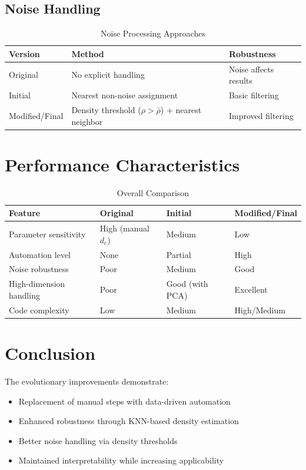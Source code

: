 \documentclass{article}
\begin{document}
\subsection{Noise Handling}
\begin{table}[H]
\centering
\caption{Noise Processing Approaches}
\begin{tabular}{lll}
\toprule
\textbf{Version} & \textbf{Method} & \textbf{Robustness} \\
\midrule
Original & No explicit handling & Noise affects results \\
Initial & Nearest non-noise assignment & Basic filtering \\
Modified/Final & Density threshold ($\rho > \bar{\rho}$) + nearest neighbor & Improved filtering \\
\bottomrule
\end{tabular}
\end{table}

\section{Performance Characteristics}

\begin{table}[H]
\centering
\caption{Overall Comparison}
\begin{tabular}{llll}
\toprule
\textbf{Feature} & \textbf{Original} & \textbf{Initial} & \textbf{Modified/Final} \\
\midrule
Parameter sensitivity & High (manual $d_c$) & Medium & Low \\
Automation level & None & Partial & High \\
Noise robustness & Poor & Medium & Good \\
High-dimension handling & Poor & Good (with PCA) & Excellent \\
Code complexity & Low & Medium & High/Medium \\
\bottomrule
\end{tabular}
\end{table}

\section{Conclusion}
The evolutionary improvements demonstrate:

\begin{itemize}
    \item Replacement of manual steps with data-driven automation
    \item Enhanced robustness through KNN-based density estimation
    \item Better noise handling via density thresholds
    \item Maintained interpretability while increasing applicability
\end{itemize}
\end{document}
